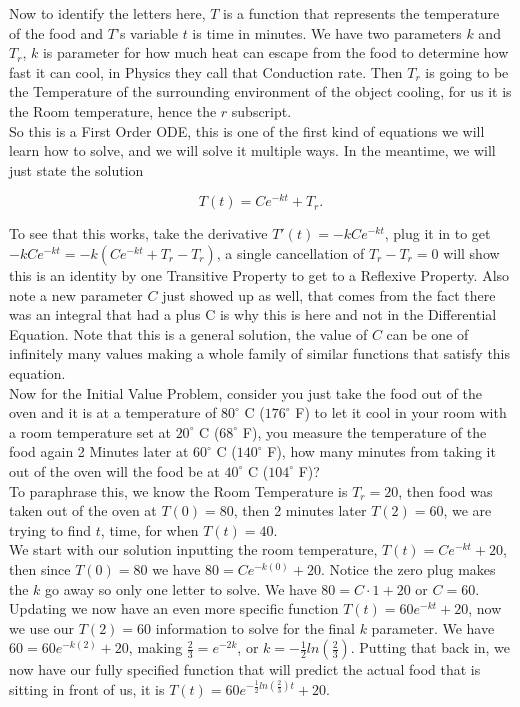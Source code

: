 \documentclass[12pt]{article}
\begin{document}
Now to identify the letters here, $T$ is a function that represents the temperature of the food and $T$'s variable $t$ is time in minutes. We have two parameters $k$ and $T_r$, $k$ is parameter for how much heat can escape from the food to determine how fast it can cool, in Physics they call that Conduction rate. Then $T_r$ is going to be the Temperature of the surrounding environment of the object cooling, for us it is the Room temperature, hence the $r$ subscript. \\

So this is a First Order ODE, this is one of the first kind of equations we will learn how to solve, and we will solve it multiple ways. In the meantime, we will just state the solution

\begin{equation*}
    T(t)=Ce^{-kt}+T_r.
\end{equation*}

To see that this works, take the derivative $T'(t)=-kCe^{-kt}$, plug it in to get $-kCe^{-kt}=-k\left(Ce^{-kt}+T_r-T_r\right)$, a single cancellation of $T_r-T_r=0$ will show this is an identity by one Transitive Property to get to a Reflexive Property. Also note a new parameter $C$ just showed up as well, that comes from the fact there was an integral that had a plus C is why this is here and not in the Differential Equation. Note that this is a general solution, the value of $C$ can be one of infinitely many values making a whole family of similar functions that satisfy this equation. \\

Now for the Initial Value Problem, consider you just take the food out of the oven and it is at a temperature of $80^{\circ}$ C  ($176^{\circ}$ F) to let it cool in your room with a room temperature set at $20^{\circ}$ C ($68^{\circ}$ F), you measure the temperature of the food again 2 Minutes later at $60^{\circ}$ C ($140^{\circ}$ F), how many minutes from taking it out of the oven will the food be at $40^{\circ}$ C ($104^{\circ}$ F)? \\

To paraphrase this, we know the Room Temperature is $T_r=20$, then food was taken out of the oven at $T(0)=80$, then 2 minutes later $T(2)=60$, we are trying to find $t$, time, for when $T(t)=40$. \\

We start with our solution inputting the room temperature, $T(t)=Ce^{-kt}+20$, then since $T(0)=80$ we have $80=Ce^{-k(0)}+20$. Notice the zero plug makes the $k$ go away so only one letter to solve. We have $80=C\cdot1+20$ or $C=60$. Updating we now have an even more specific function $T(t)=60e^{-kt}+20$, now we use our $T(2)=60$ information to solve for the final $k$ parameter. We have $60=60e^{-k(2)}+20$, making $\frac{2}{3}=e^{-2k}$, or $k=-\frac{1}{2}ln(\frac{2}{3})$. Putting that back in, we now have our fully specified function that will predict the actual food that is sitting in front of us, it is $T(t)=60e^{-\frac{1}{2}ln(\frac{2}{3})t}+20$. \\
\end{document}
